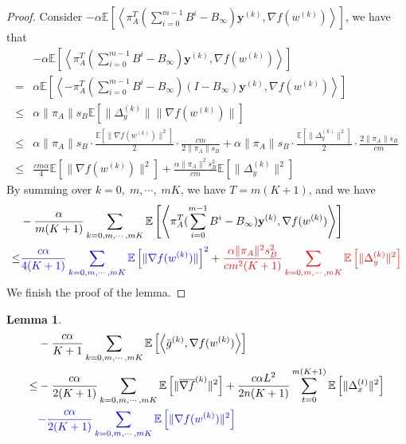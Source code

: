 \documentclass{article}
\newtheorem{lemma}[thm]{Lemma}
\newcommand{\vy}{{\mathbf{y}}}
\newcommand{\EE}[1]{\mathbb{E}\left[#1\right]}
\newcommand{\norm}[1]{\| #1 \|}
\newcommand{\ip}[1]{\left\langle#1\right\rangle}
\begin{document}
\begin{proof}
  Consider $-\alpha\EE{\ip{\pi_A^T(\sum_{i=0}^{m-1}B^i-B_{\infty}) \vy^{(k)},\nabla f(w^{(k)})}}$, we have that 
  \begin{align*}
    &-\alpha\EE{\ip{\pi_A^T(\sum_{i=0}^{m-1}B^i-B_{\infty}) \vy^{(k)},\nabla f(w^{(k)})}}\\
    =&\alpha\EE{\ip{-\pi_A^T(\sum_{i=0}^{m-1}B^i-B_{\infty})(I-B_{\infty}) \vy^{(k)},\nabla f(w^{(k)})}}\\ 
    \leq&\alpha\norm{\pi_A}s_B \EE{\norm{\Delta_y^{(k)}}\norm{\nabla f(w^{(k)})}}\\ \leq & \alpha \norm{\pi_A}s_B \cdot \frac{\EE{\norm{\nabla f(w^{(k)})}^2}}{2}\cdot \frac{cm}{2\norm{\pi_A}s_B}+\alpha \norm{\pi_A}s_B \cdot \frac{\EE{\norm{\Delta_y^{(k)}}^2}}{2}\cdot \frac{2\norm{\pi_A}s_B}{cm}\\
    \leq& \frac{cm\alpha}{4}\EE{\norm{\nabla f(w^{(k)})}^2}+\frac{\alpha\norm{\pi_A}^2s_B^2}{cm}\EE{\norm{\Delta_y^{(k)}}^2}
  \end{align*}
  By summing over $k=0,\;m,\cdots,\;mK$, we have $T=m(K+1)$, and we have
  \begin{align*}
    &-\frac{\alpha}{m(K+1)}\sum_{k=0,m,\cdots,mK}\EE{\ip{\pi_A^T(\sum_{i=0}^{m-1}B^i-B_{\infty}) \vy^{(k)},\nabla f(w^{(k)})}}\\ \leq& \textcolor{blue}{\frac{c\alpha}{4(K+1)}\sum_{k=0,m,\cdots,mK}\EE{\norm{\nabla f(w^{(k)})}}^2}+\textcolor{red}{\frac{\alpha\norm{\pi_A}^2s_B^2}{cm^2(K+1)}\sum_{k=0,m,\cdots,mK}\EE{\norm{\Delta_y^{(k)}}^2}}
  \end{align*}
  We finish the proof of the lemma.
\end{proof}

\begin{lemma}\label{Convergence Analysis: Inner Product Term-2}
  \begin{align*}
    &-\frac{c\alpha }{K+1} \sum_{k=0,m,\cdots,mK}\EE{\ip{\bar{g}^{(k)},\nabla f(w^{(k)})}}\\\leq& -\frac{c\alpha }{2(K+1)}\sum_{k=0,m,\cdots,mK}\EE{\norm{\overline{\nabla f}^{(k)}}^2}+\frac{c\alpha L^2}{2n(K+1)}\sum_{t=0}^{m(K+1)}\EE{\norm{\Delta_x^{(t)}}^2}\\&\textcolor{blue}{-\frac{c\alpha}{2(K+1)}\sum_{k=0,m,\cdots,mK}\EE{\norm{\nabla f(w^{(k)})}^2}}
  \end{align*}
\end{lemma}
\end{document}
